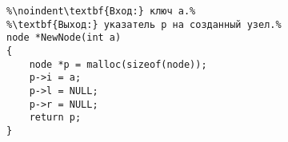 \documentclass{article}
\begin{document}
\begin{lstlisting}[escapechar=\%]
%2. Создание нового узла - конструктор NewNode.%
%\noindent\textbf{Вход:} ключ a.%
%\textbf{Выход:} указатель p на созданный узел.%
node *NewNode(int a)
{
	node *p = malloc(sizeof(node));
	p->i = a;
	p->l = NULL;
	p->r = NULL;
	return p;
}
\end{lstlisting}
\end{document}
